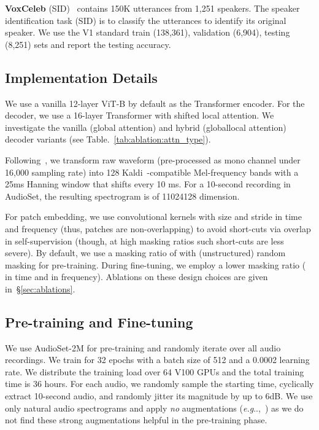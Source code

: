 \documentclass{article}
\makeatletter
\DeclareRobustCommand\onedot{\futurelet\@let@token\@onedot}
\def\@onedot{\ifx\@let@token.\else.\null\fi\xspace}
\def\eg{\emph{e.g}\onedot} \def\Eg{\emph{E.g}\onedot}
\makeatother
\begin{document}
\noindent \textbf{VoxCeleb}
(SID)~\cite{Nagrani2020VoxcelebLS} contains 150K utterances from 1,251 speakers. The speaker identification task (SID) is to classify the utterances to identify its original speaker. We use the V1 standard train (138,361), validation (6,904), testing (8,251) sets and  report the testing accuracy.


\subsection{Implementation Details\label{sec:exp:impl}}


We use a vanilla 12-layer ViT-B by default as the Transformer encoder. 
For the decoder, we use a 16-layer Transformer with shifted local attention.
We investigate the vanilla (global attention) and hybrid (globallocal attention) decoder variants (see Table.~\ref{tab:ablation:attn_type}).

Following~\cite{gong2021ast,Nagrani21c}, we transform raw waveform (pre-processed as mono channel under 16,000 sampling rate) into 128 Kaldi~\cite{povey2011kaldi}-compatible Mel-frequency bands with a 25ms Hanning window that shifts every 10 ms. 
For a 10-second recording in AudioSet, the resulting spectrogram is of 11024128 dimension.

For patch embedding, we use convolutional kernels with  size and stride in time and frequency (thus, patches are non-overlapping) to avoid short-cuts via overlap in self-supervision (though, at high masking ratios such short-cuts are less severe). 
By default, we use a masking ratio of  with (unstructured) random masking for pre-training. 
During fine-tuning, we employ a lower masking ratio ( in time and  in frequency). Ablations on these design choices are given in~\S\ref{sec:ablations}.


\subsection{Pre-training and Fine-tuning\label{sec:exp:setup}}
We use AudioSet-2M for pre-training and randomly iterate over all audio recordings. 
We train for 32 epochs with a batch size of 512 and a 0.0002 learning rate. 
We distribute the training load over 64 V100 GPUs and the total training time is 36 hours.
For each audio, we randomly sample the starting time, cyclically extract 10-second audio, and randomly jitter its magnitude by up to  6dB. 
We use only natural audio spectrograms and apply \emph{no} augmentations (\eg,~\cite{Park2019SpecAugmentAS,cutmix,mixup}) as we do not find these strong augmentations helpful in the pre-training phase.
\end{document}
